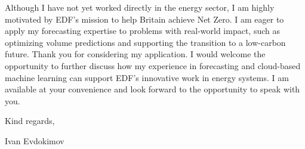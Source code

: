 \documentclass[11pt,a4paper,sans]{moderncv}
\begin{document}
Although I have not yet worked directly in the energy sector, I am highly motivated by EDF’s mission to help Britain achieve Net Zero. I am eager to apply my forecasting expertise to problems with real-world impact, such as optimizing volume predictions and supporting the transition to a low-carbon future.
Thank you for considering my application. I would welcome the opportunity to further discuss how my experience in forecasting and cloud-based machine learning can support EDF’s innovative work in energy systems. I am available at your convenience and look forward to the opportunity to speak with you.

\vspace{0.25cm}
Kind regards,

Ivan Evdokimov
\end{document}
